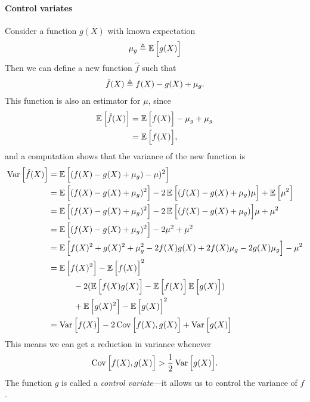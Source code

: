 \paragraph{Control variates} Consider a function $g(X)$ with known expectation
\begin{align*}
  \mu_{g} \triangleq \operatorname{\mathbb{E}} \Big[ g(X) \Big]
\end{align*}
Then we can define a new function $\hat{f}$ such that
\begin{align*}
  \hat{f}(X) \triangleq f(X) - g(X) + \mu_{g}.
\end{align*}
This function is also an estimator for $\mu$, since
\begin{align*}
    \operatorname{\mathbb{E}} \Big[ \hat{f}(X) \Big] &= \operatorname{\mathbb{E}} \Big[ f(X) \Big] - \mu_{g} + \mu_{g} \\
        &= \operatorname{\mathbb{E}} \Big[ f(X) \Big],
\end{align*}
and a computation shows that the variance of the new function is
\begin{align*}
  \operatorname{Var} \Big[ \hat{f}(X) \Big]
    &= \operatorname{\mathbb{E}} \Big[ (f(X) - g(X) + \mu_{g}) - \mu)^2 \Big] \\
    &= \operatorname{\mathbb{E}} \Big[ (f(X) - g(X) + \mu_{g})^2 \Big] - 2\operatorname{\mathbb{E}} \Big[ (f(X) - g(X) + \mu_{g})\mu \Big] + \operatorname{\mathbb{E}} \Big[ \mu^2 \Big] \\
    &= \operatorname{\mathbb{E}} \Big[ (f(X) - g(X) + \mu_{g})^2 \Big] - 2\operatorname{\mathbb{E}} \Big[ (f(X) - g(X) + \mu_{g})\Big]\mu + \mu^2 \\
    &= \operatorname{\mathbb{E}} \Big[ (f(X) - g(X) + \mu_{g})^2 \Big] - 2\mu^2  + \mu^2 \\
    &= \operatorname{\mathbb{E}} \Big[ f(X)^2 + g(X)^2 + \mu_{g}^2 - 2f(X)g(X) + 2f(X)\mu_{g} - 2g(X)\mu_{g} \Big] - \mu^2\\
    &= \operatorname{\mathbb{E}} \Big[ f(X)^2 \Big] - \operatorname{\mathbb{E}} \Big[ f(X) \Big]^2 \\
      &\quad\qquad - 2(\operatorname{\mathbb{E}} \Big[ f(X)g(X) \Big] - \operatorname{\mathbb{E}} \Big[ f(X) \Big]\operatorname{\mathbb{E}} \Big[ g(X) \Big]) \\
      &\quad\qquad + \operatorname{\mathbb{E}} \Big[ g(X)^2 \Big] - \operatorname{\mathbb{E}} \Big[ g(X) \Big]^2 \\
    &= \operatorname{Var} \Big[ f(X) \Big] - 2  \operatorname{Cov} \Big[ f(X), g(X) \Big] + \operatorname{Var} \Big[ g(X) \Big]
\end{align*}
This means we can get a reduction in variance whenever
\begin{equation*}
  \operatorname{Cov} \Big[ f(X), g(X) \Big] > \frac{1}{2} \operatorname{Var} \Big[ g(X) \Big].
\end{equation*}
The function $g$ is called a \textit{control variate}---it allows us to control the variance of $f$.

